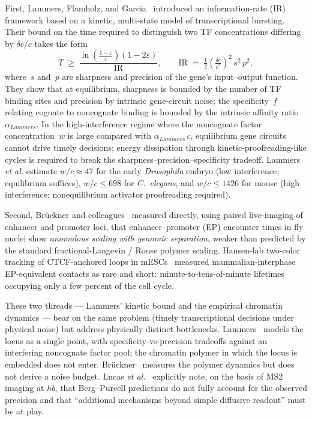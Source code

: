 \documentclass[11pt]{article}
\begin{document}
First, Lammers, Flamholz, and Garcia~\cite{Lammers2023} introduced an
information-rate (IR) framework based on a kinetic, multi-state model of
transcriptional bursting. Their bound on the time required to distinguish
two TF concentrations differing by $\delta c/c$ takes the form
\begin{equation}
  \overline{T} \;\geq\; \frac{\ln\!\left(\frac{1-\varepsilon}{\varepsilon}\right)(1-2\varepsilon)}{\mathrm{IR}},
  \qquad
  \mathrm{IR} \;=\; \tfrac{1}{2}\!\left(\tfrac{\delta c}{c^{*}}\right)^{\!2}\, s^{2}\, p^{2},
  \label{eq:lammers}
\end{equation}
where~$s$ and~$p$ are sharpness and precision of the gene's input--output
function. They show that at equilibrium, sharpness is bounded by the number
of TF binding sites and precision by intrinsic gene-circuit noise; the
specificity~$f$ relating cognate to noncognate binding is bounded by the
intrinsic affinity ratio~$\alpha_{Lammers}$. In the high-interference
regime where the noncognate factor concentration~$w$ is large compared with
$\alpha_{Lammers}\,c$, equilibrium gene circuits cannot drive timely
decisions; energy dissipation through kinetic-proofreading-like cycles is
required to break the sharpness--precision--specificity tradeoff. Lammers
\textit{et al.} estimate $w/c\approx 47$ for the early \textit{Drosophila}
embryo (low interference; equilibrium suffices), $w/c\le 698$ for
\textit{C.~elegans}, and $w/c\le 1426$ for mouse (high interference;
nonequilibrium activator proofreading required).

Second, Br\"uckner and colleagues~\cite{Bruckner2023} measured directly,
using paired live-imaging of enhancer and promoter loci, that
enhancer--promoter (EP) encounter times in fly nuclei show \emph{anomalous
scaling with genomic separation}, weaker than predicted by the standard
fractional-Langevin / Rouse polymer scaling. Hansen-lab two-color tracking
of CTCF-anchored loops in mESCs~\cite{Gabriele2022,Mach2022} measured
mammalian-interphase EP-equivalent contacts as rare and short:
minute-to-tens-of-minute lifetimes occupying only a few percent of the
cell cycle.

These two threads --- Lammers' kinetic bound and the empirical chromatin
dynamics --- bear on the same problem (timely transcriptional decisions
under physical noise) but address physically distinct bottlenecks.
Lammers~\cite{Lammers2023} models the locus as a single point, with
specificity-vs-precision tradeoffs against an interfering noncognate factor
pool; the chromatin polymer in which the locus is embedded does not enter.
Br\"uckner~\cite{Bruckner2023} measures the polymer dynamics but does not
derive a noise budget. Lucas \textit{et al.}~\cite{Lucas2018} explicitly
note, on the basis of MS2 imaging at \textit{hb}, that Berg--Purcell
predictions do not fully account for the observed precision and that
``additional mechanisms beyond simple diffusive readout'' must be at play.
\end{document}
